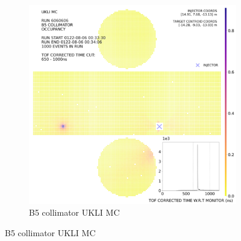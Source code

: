 \begin{figure}[htp]
    \medskip
    
    \begin{subfigure}{0.49\columnwidth}
    \centering
    \includegraphics[width=\textwidth]{Figures/ukli_mc_B5.PNG}
    \caption{B5 collimator UKLI MC}
    
    \end{subfigure}

    \end{figure}

